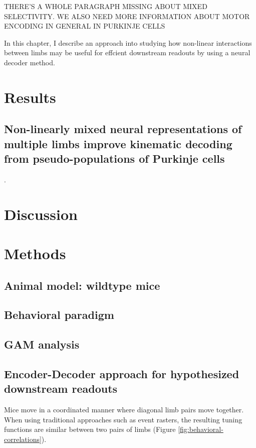 THERE'S A WHOLE PARAGRAPH MISSING ABOUT MIXED SELECTIVITY. WE ALSO NEED MORE INFORMATION ABOUT MOTOR ENCODING IN GENERAL IN PURKINJE CELLS

In this chapter, I describe an approach into studying how non-linear interactions between limbs may be useful for effcient downstream readouts by using a neural decoder method.











\section{Results}
\subsection{Non-linearly mixed neural representations of multiple limbs improve kinematic decoding from pseudo-populations of Purkinje cells}.
\section{Discussion}
\section{Methods}
\subsection{Animal model: wildtype mice}
\subsection{Behavioral paradigm}
\subsection{GAM analysis}
\subsection{Encoder-Decoder approach for hypothesized downstream readouts}



Mice move in a coordinated manner where diagonal limb pairs move together. When using traditional approaches such as event rasters, the resulting tuning functions are similar between two pairs of limbs (Figure \ref{fig:behavioral-correlations}).


